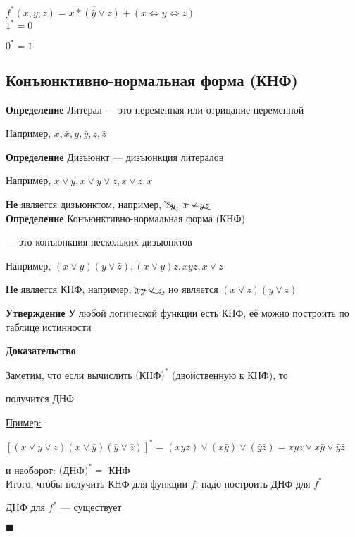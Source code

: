 \documentclass[a4paper, 12pt] {article}
\begin{document}
$ f^{*}(x, y, z) = \overline{x * ( \bar y \vee  z)} +  (x\Leftrightarrow y\Leftrightarrow z) $\\ 

$ 1^{*}=0 $

$ 0^{*}=1 $\\

\subsection{Конъюнктивно-нормальная форма (КНФ)}

\textbf{Определение} Литерал --- это переменная или отрицание переменной

Например, $ x, \bar x, y, \bar y, z, \bar z $

\textbf{Определение} Дизъюнкт --- дизъюнкция литералов

Например, $ x \vee y, x \vee y \vee \bar z, x \vee \bar z, \bar x $

\textbf{Не} является дизъюнктом, например, $ \bcancel{\bar x y},$  $ \bcancel{x \vee yz} $\\

\textbf{Определение} Конъюнктивно-нормальная форма (КНФ)

 --- это конъюнкция нескольких дизъюнктов

Например, $ (x \vee y)(y \vee \bar z), (x \vee y)z, xyz, x \vee z $

\textbf{Не} является КНФ, например,  $ \bcancel{xy \vee z} $, но является $ (x \vee z)(y \vee z ) $

\textbf{Утверждение} У любой логической функции есть КНФ, её можно построить по таблице истинности

\textbf{Доказательство}

Заметим, что если вычислить $ ($КНФ$)^{*} $ (двойственную к КНФ), то 

получится ДНФ

\underline{Пример:}

$ [(x \vee y \vee z)(x \vee \bar y)(\bar y \vee \bar z)]^{*} = (x y z) \vee (x \bar y) \vee (\bar y \bar z) = x y z \vee x \bar y \vee \bar y \bar z $

и наоборот: $ ($ДНФ$)^{*} = $ КНФ\\

Итого, чтобы получить КНФ для функции $ f $, надо построить ДНФ для $ f^{*} $

ДНФ для $ f^{*} $ --- существует

$ \blacksquare $\\
\end{document}

